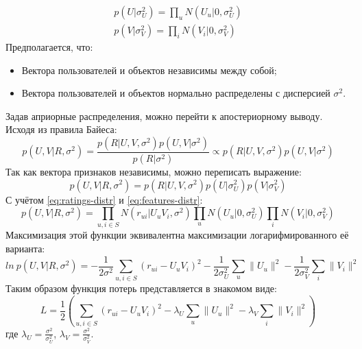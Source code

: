 \begin{equation}\label{eq:features-distr}
\begin{aligned}
        p(U|\sigma_{U}^2) = \prod_{u}{N(U_{u}|0, \sigma_{U}^2)} \\
        p(V|\sigma_{V}^2) = \prod_{i}{N(V_{i}|0, \sigma_{V}^2)}
\end{aligned}
\end{equation}
Предполагается, что:
\begin{itemize}
\item Вектора пользователей и объектов независимы между собой;
\item Вектора пользователей и объектов нормально распределены с дисперсией $\sigma^2$.
\end{itemize}
Задав априорные распределения, можно перейти к апостериорному выводу.
Исходя из правила Байеса:
\begin{equation}\label{eq:21}
        p(U,V|R, \sigma^2) = \frac{p(R|U, V, \sigma^2)p(U,V|\sigma^2)}{p(R|\sigma^2)} \propto p(R|U, V, \sigma^2)p(U,V|\sigma^2)
\end{equation}
Так как вектора признаков независимы, можно переписать выражение:
\begin{equation}\label{eq:aposteriori-probs}
        p(U,V|R, \sigma^2) = p(R|U, V, \sigma^2)p(U|\sigma_{U}^2)p(V|\sigma_{V}^2)
\end{equation}
С учётом \eqref{eq:ratings-distr} и \eqref{eq:features-distr}:
\begin{equation}\label{eq:aposteriori-inferred}
        p(U,V|R, \sigma^2) = \prod_{u, i \in S}{N(r_{ui}|U_{u}V_{i}, \sigma^2)} \prod_{u}{N(U_{u}|0, \sigma_{U}^2)} \prod_{i}{N(V_{i}|0, \sigma_{V}^2)}
\end{equation}
Максимизация этой функции эквивалентна максимизации логарифмированного её варианта:
\begin{equation}\label{eq:aposteriori-inferred}
        ln~p(U,V|R, \sigma^2) = - \frac{1}{2\sigma^2}\sum_{u, i \in S}{(r_{ui} - U_{u}V_{i})^2} - \frac{1}{2\sigma_{U}^2}\sum_{u}{\|U_{u}\|^2} - \frac{1}{2\sigma_{V}^2}\sum_{i}{\|V_{i}\|^2}
\end{equation}
Таким образом функция потерь представляется в знакомом виде:
\begin{equation}\label{eq:aposteriori-inferred}
        L = \frac{1}{2}(\sum_{u, i \in S}{(r_{ui} - U_{u}V_{i})^2} - \lambda_{U}\sum_{u}{\|U_{u}\|^2} - \lambda_{V}\sum_{i}{\|V_{i}\|^2})
\end{equation}
где $\lambda_{U} = \frac{\sigma^2}{\sigma_{U}^2}$,
$\lambda_{V} = \frac{\sigma^2}{\sigma_{V}^2}$.

